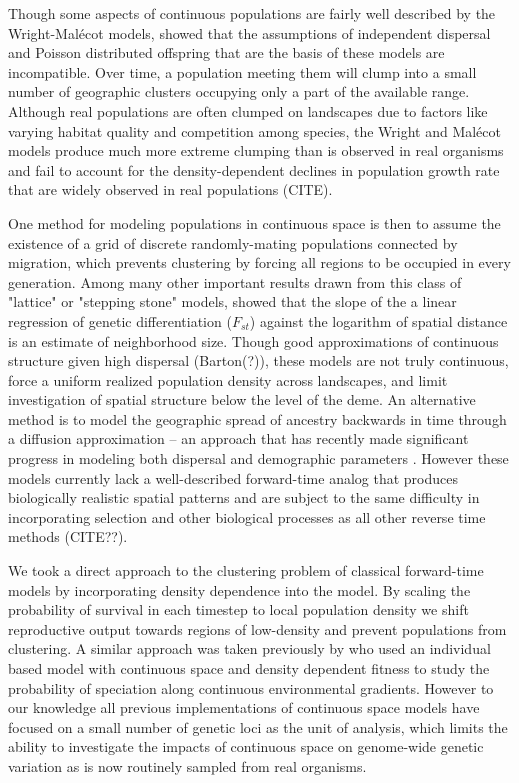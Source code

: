 \documentclass[9pt,twocolumn,twoside,lineno]{gsajnl}
\begin{document}
Though some aspects of continuous populations are fairly well described by the Wright-Malécot models, \cite{Felsenstein1975} showed that the assumptions of independent dispersal and Poisson distributed offspring that are the basis of these models are incompatible. Over time, a population meeting them will clump into a small number of geographic clusters occupying only a part of the available range. Although real populations are often clumped on landscapes due to factors like varying habitat quality and competition among species, the Wright and Malécot models produce much more extreme clumping than is observed in real organisms and fail to account for the density-dependent declines in population growth rate that are widely observed in real populations (CITE). 

One method for modeling populations in continuous space is then to assume the existence of a grid of discrete randomly-mating populations connected by migration, which prevents clustering by forcing all regions to be occupied in every generation. Among many other important results drawn from this class of "lattice" or "stepping stone" models, \cite{Rousset1997} showed that the slope of the a linear regression of genetic differentiation ($F_{st}$) against the logarithm of spatial distance is an estimate of neighborhood size. Though good approximations of continuous structure given high dispersal (Barton(?)), these models are not truly continuous, force a uniform realized population density across landscapes, and limit investigation of spatial structure below the level of the deme. An alternative method is to model the geographic spread of ancestry backwards in time through a diffusion approximation -- an approach that has recently made significant progress in modeling both dispersal and demographic parameters \citep{Barton2010,Kelleher2014,Ringbauer2017,Ringbauer2018}. However these models currently lack a well-described forward-time analog that produces biologically realistic spatial patterns and are subject to the same difficulty in incorporating selection and other biological processes as all other reverse time methods (CITE??).

We took a direct approach to the clustering problem of classical forward-time models by incorporating density dependence into the model. By scaling the probability of survival in each timestep to local population density we shift reproductive output towards regions of low-density and prevent populations from clustering. A similar approach was taken previously by \citep{Doebeli2003} who used an individual based model with continuous space and density dependent fitness to study the probability of speciation along continuous environmental gradients. However to our knowledge all previous implementations of continuous space models have focused on a small number of genetic loci as the unit of analysis, which limits the ability to investigate the impacts of continuous space on genome-wide genetic variation as is now routinely sampled from real organisms. 
\end{document}
